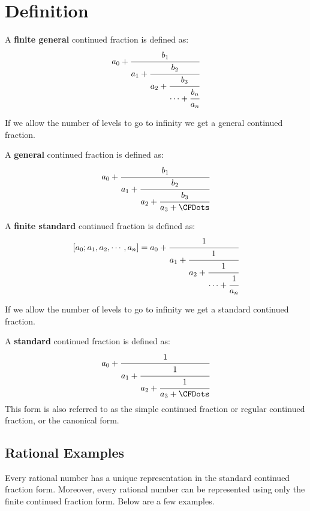 \documentclass[a4paper]{article}
\begin{document}
    \section{Definition}\label{sec:definition}

    \begin{definition}
        \label{def_finite_gen_c_fract}
        A \textbf{finite general} continued fraction is defined as:
        \[
            a_0 +
            \cfrac{b_1}{a_1+\cfrac{b_2}{a_2 +\cfrac{b_3}{\cdots + \cfrac{b_n}{a_n} }}}
        \]
    \end{definition}

    If we allow the number of levels to go to infinity we get a general continued fraction.

    \begin{definition}
        \label{def_gen_c_fract}
        A \textbf{general} continued fraction is defined as:
        \[
            a_0 +
            \cfrac{b_1}{a_1+\cfrac{b_2}{a_2 +\cfrac{b_3}{a_3 + \CFDots}}}
        \]
    \end{definition}

    \begin{definition}
        \label{def_finite_c_fract}
        A \textbf{finite standard} continued fraction is defined as:
        \[
            [a_0;a_1, a_2, \cdots, a_n] = a_0 +
            \cfrac{1}{a_1+\cfrac{1}{a_2 +\cfrac{1}{\cdots + \cfrac{1}{a_n}}}}
        \]
    \end{definition}

    If we allow the number of levels to go to infinity we get a standard continued fraction.

    \begin{definition}
        \label{def_c_fract}
        A \textbf{standard} continued fraction is defined as:
        \[
            a_0 +
            \cfrac{1}{a_1+\cfrac{1}{a_2 +\cfrac{1}{a_3 + \CFDots}}}
        \]
        This form is also referred to as the simple continued fraction or regular continued fraction, or the canonical form.
    \end{definition}

    \subsection{Rational Examples}\label{subsec:rational-examples}
    Every rational number has a unique representation in the standard continued fraction form.
    Moreover, every rational number can be represented using only the finite continued fraction form.
    Below are a few examples.
\end{document}
